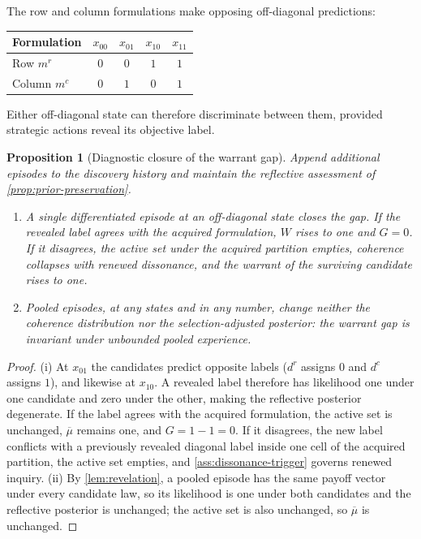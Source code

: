 \documentclass[11pt]{article}
\newtheorem{proposition}[assumption]{Proposition}
\begin{document}
The row and column formulations make opposing off-diagonal predictions:
\begin{center}
\begin{tabular}{@{}lcccc@{}}
\toprule
Formulation & $x_{00}$ & $x_{01}$ & $x_{10}$ & $x_{11}$\\
\midrule
Row $m^r$ & $0$ & $0$ & $1$ & $1$\\
Column $m^c$ & $0$ & $1$ & $0$ & $1$\\
\bottomrule
\end{tabular}
\end{center}
Either off-diagonal state can therefore discriminate between them, provided
strategic actions reveal its objective label.

\begin{proposition}[Diagnostic closure of the warrant gap]
\label{prop:warrant-closure}
Append additional episodes to the discovery history and maintain the
reflective assessment of \cref{prop:prior-preservation}.
\begin{enumerate}[label=(\roman*)]
  \item A single differentiated episode at an off-diagonal state closes the
  gap.  If the revealed label agrees with the acquired formulation, $W$ rises
  to one and $G=0$.  If it disagrees, the active set under the acquired
  partition empties, coherence collapses with renewed dissonance, and the
  warrant of the surviving candidate rises to one.
  \item Pooled episodes, at any states and in any number, change neither the
  coherence distribution nor the selection-adjusted posterior: the warrant gap
  is invariant under unbounded pooled experience.
\end{enumerate}
\end{proposition}

\begin{proof}
(i) At $x_{01}$ the candidates predict opposite labels ($d^r$ assigns $0$ and
$d^c$ assigns $1$), and likewise at $x_{10}$.  A revealed label therefore has
likelihood one under one candidate and zero under the other, making the
reflective posterior degenerate.  If the label agrees with the acquired
formulation, the active set is unchanged, $\overline\mu$ remains one, and
$G=1-1=0$.  If it disagrees, the new label conflicts with a previously
revealed diagonal label inside one cell of the acquired partition, the active
set empties, and \cref{ass:dissonance-trigger} governs renewed inquiry.
(ii) By \cref{lem:revelation}, a pooled episode has the same payoff vector
under every candidate law, so its likelihood is one under both candidates and
the reflective posterior is unchanged; the active set is also unchanged, so
$\overline\mu$ is unchanged.
\end{proof}
\end{document}
